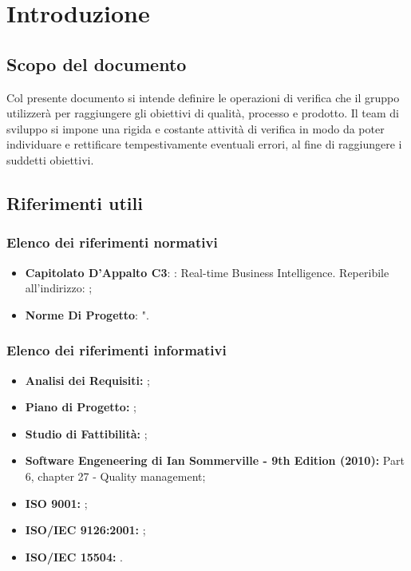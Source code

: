 
\section{Introduzione}
	
	\subsection{Scopo del documento}
		Col presente documento si intende definire le operazioni di verifica che il gruppo \groupname{} utilizzerà per raggiungere gli obiettivi di qualità, processo e prodotto. Il team di sviluppo si impone una rigida e costante attività di verifica in modo da poter individuare e rettificare tempestivamente eventuali errori, al fine di raggiungere i suddetti obiettivi. 
	
	

	\subsection{Riferimenti utili}
		

		\subsubsection{Elenco dei riferimenti normativi}
			\begin{itemize}
				\item \textbf{Capitolato D'Appalto C3}: \projectname{}: Real-time Business Intelligence. Reperibile all'indirizzo: ;
				\item \textbf{Norme Di Progetto}: ".
			\end{itemize}
		

		\subsubsection{Elenco dei riferimenti informativi}
			\begin{itemize}
				\item \textbf{Analisi dei Requisiti:} ;
				\item \textbf{Piano di Progetto:} ;
				\item \textbf{Studio di Fattibilità:} ;
				\item \textbf{Software Engeneering di Ian Sommerville - 9th Edition (2010):} Part 6, chapter 27 - Quality management;
				\item \textbf{ISO 9001:} ;
				\item \textbf{ISO/IEC 9126:2001:} ;
				\item \textbf{ISO/IEC 15504:} .
			\end{itemize}
